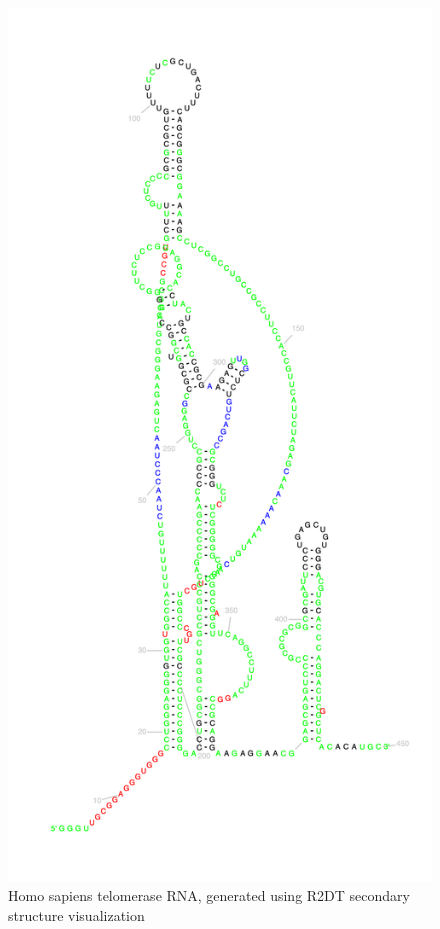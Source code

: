 \documentclass[sigconf]{acmart}
\begin{document}
\begin{figure}
  \includegraphics[width=\linewidth]{for_paper.png}
  \caption{Homo sapiens telomerase RNA, generated using R2DT secondary structure visualization}
  \label{fig:telomerase}
\end{figure}
\end{document}
